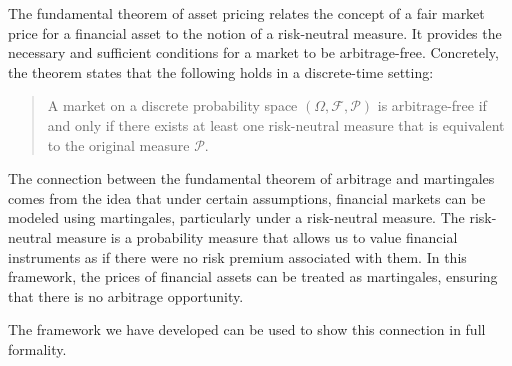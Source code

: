 The fundamental theorem of asset pricing relates the concept of a fair market price for a financial asset to the notion of a risk-neutral measure. It provides the necessary and sufficient conditions for a market to be arbitrage-free. Concretely, the theorem states that the following holds in a discrete-time setting:

\begin{quote}
{\raggedright
A market on a discrete probability space $(\Omega, \mathcal{F}, \mathcal{P})$ is arbitrage-free if and only if there exists at least one risk-neutral measure that is equivalent to the original measure $\mathcal{P}$.
}
\end{quote}

The connection between the fundamental theorem of arbitrage and martingales comes from the idea that under certain assumptions, financial markets can be modeled using martingales, particularly under a risk-neutral measure. The risk-neutral measure is a probability measure that allows us to value financial instruments as if there were no risk premium associated with them. In this framework, the prices of financial assets can be treated as martingales, ensuring that there is no arbitrage opportunity.

The framework we have developed can be used to show this connection in full formality.